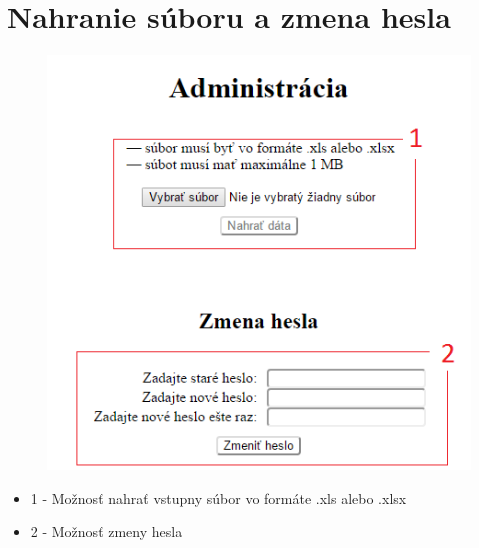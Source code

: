\documentclass[12pt,a4paper]{report}
\begin{document}
\pagebreak
\section{Nahranie súboru a zmena hesla}
\begin{figure}[htb]
	\includegraphics[scale=0.8]{administracia}
	\label{fig:administracia}
\end{figure}

\begin{itemize}
	\item 1 - Možnosť nahrať vstupny súbor vo formáte .xls alebo .xlsx
	\item 2 - Možnosť zmeny hesla
\end{itemize}
\pagebreak
\end{document}
